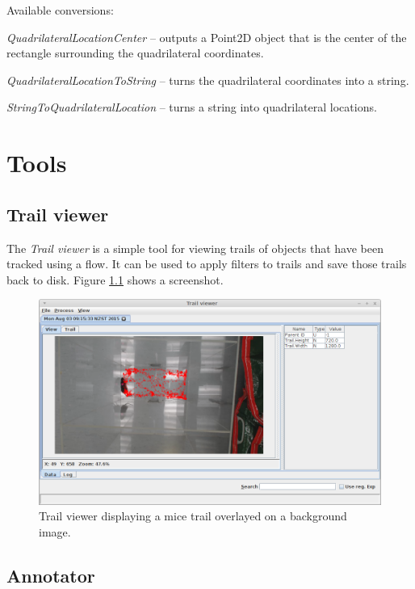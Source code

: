 \documentclass[a4paper]{book}
\begin{document}
\noindent Available conversions:
\begin{tight_itemize}
  \item \textit{QuadrilateralLocationCenter} -- outputs a Point2D object that
  is the center of the rectangle surrounding the quadrilateral coordinates.
  \item \textit{QuadrilateralLocationToString} -- turns the quadrilateral
  coordinates into a string.
  \item \textit{StringToQuadrilateralLocation} -- turns a string into quadrilateral
  locations.
\end{tight_itemize}

\chapter{Tools}

\section{Trail viewer}
The \textit{Trail viewer} is a simple tool for viewing trails of objects that
have been tracked using a flow. It can be used to apply filters to trails
and save those trails back to disk. Figure \ref{trail_viewer} shows a screenshot.

\begin{figure}[htb]
  \centering
  \includegraphics[width=12.0cm]{images/trail_viewer.png}
  \caption{Trail viewer displaying a mice trail overlayed on a background image.}
  \label{trail_viewer}
\end{figure}

\section{Annotator}
\end{document}
